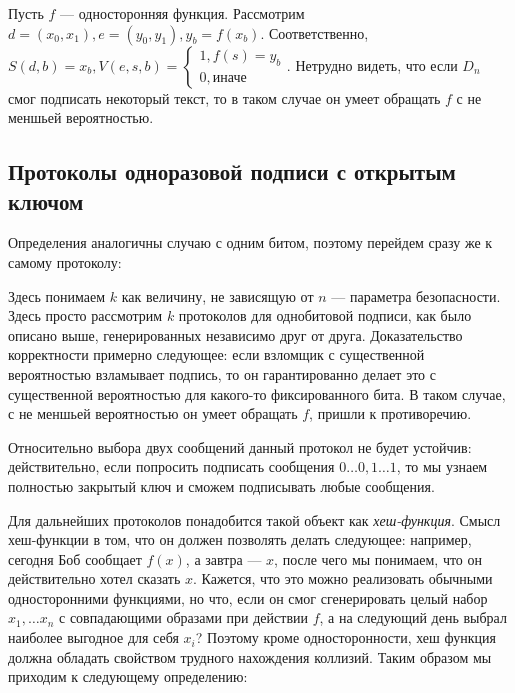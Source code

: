 \begin{example}
    Пусть \(f\) --- односторонняя функция. Рассмотрим \(d = (x_0, x_1), e = (y_0, y_1), y_b = f(x_b)\). Соответственно, \(S(d, b) = x_b, V(e, s, b) = \begin{cases}
        1, f(s) = y_b \\
        0, \text{иначе}
    \end{cases}\). Нетрудно видеть, что если \(D_n\) смог подписать некоторый текст, то в таком случае он умеет обращать \(f\) с не меншьей вероятностью.
\end{example}

\subsection{Протоколы одноразовой подписи с открытым ключом}

Определения аналогичны случаю с одним битом, поэтому перейдем сразу же к самому протоколу:
\begin{example}
    Здесь понимаем \(k\) как величину, не зависящую от \(n\) --- параметра безопасности. Здесь просто рассмотрим \(k\) протоколов для однобитовой подписи, как было описано выше, генерированных независимо друг от друга. Доказательство корректности примерно следующее: если взломщик с существенной вероятностью взламывает подпись, то он гарантированно делает это с существенной вероятностью для какого-то фиксированного бита. В таком случае, с не меншьей вероятностью он умеет обращать \(f\), пришли к противоречию.
\end{example}

\begin{note}
    Относительно выбора двух сообщений данный протокол не будет устойчив: действительно, если попросить подписать сообщения \(0\dots 0, 1\dots 1\), то мы узнаем полностью закрытый ключ и сможем подписывать любые сообщения.
\end{note}

Для дальнейших протоколов понадобится такой объект как \emph{хеш-функция}. Смысл хеш-функции в том, что он должен позволять делать следующее: например, сегодня Боб сообщает \(f(x)\), а завтра --- \(x\), после чего мы понимаем, что он действительно хотел сказать \(x\). Кажется, что это можно реализовать обычными односторонними функциями, но что, если он смог сгенерировать целый набор \(x_1, \dots x_n\) с совпадающими образами при действии \(f\), а на следующий день выбрал наиболее выгодное для себя \(x_i\)? Поэтому кроме односторонности, хеш функция должна обладать свойством трудного нахождения коллизий. Таким образом мы приходим к следующему определению:

